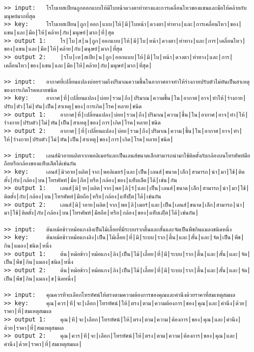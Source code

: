 \documentclass[11pt]{article}
\begin{document}
\begin{Verbatim}[commandchars=\\\{\}]
>> input:	โรโบเทสเปียนถูกออกแบบให้มีใบหน้าดวงตาท่าทางและการเคลื่อนไหวของแขนและมือให้คล้ายกับมนุษย์มากที่สุด
>> key:		โรโบเทสเปียน|ถูก|ออก|แบบ|ให้|มี|ใบหน้า|ดวงตา|ท่าทาง|และ|การเคลื่อนไหว|ของ|แขน|และ|มือ|ให้|คล้าย|กับ|มนุษย์|มาก|ที่|สุด
>> output 1:	โร|โบ|ส|น|ถูก|ออกแบบ|ให้|มี|ใบ|หน้า|ดวงตา|ท่าทาง|และ|การ|เคลื่อนไหว|ของ|แขน|และ|มือ|ให้|คล้าย|กับ|มนุษย์|มาก|ที่สุด
>> output 2:	|รโบ|เท|สเปีย|น|ถูก|ออกแบบ|ให้|มี|ใบ|หน้า|ดวงตา|ท่าทาง|และ|การ|เคลื่อนไหว|ของ|แขน|และ|มือ|ให้|คล้าย|กับ|มนุษย์|มาก|ที่สุด|

>> input:	อากาศที่เปลี่ยนแปลงบ่อยรวมถึงปริมาณความชื้นในอากาศอาจทำให้ร่างกายปรับตัวไม่ทันเป็นสาเหตุของการเกิดโรคหลายชนิด
>> key:		อากาศ|ที่|เปลี่ยนแปลง|บ่อย|รวม|ถึง|ปริมาณ|ความชื้น|ใน|อากาศ|อาจ|ทำให้|ร่างกาย|ปรับ|ตัว|ไม่|ทัน|เป็น|สาเหตุ|ของ|การเกิด|โรค|หลาย|ชนิด
>> output 1:	อากาศ|ที่|เปลี่ยนแปลง|บ่อย|รวม|ถึง|ปริมาณ|ความ|ชื้น|ใน|อากาศ|อาจ|ทำ|ให้|ร่างกาย|ปรับตัว|ไม่|ทัน|เป็น|สาเหตุ|ของ|การ|เกิด|โรค|หลาย|ชนิด
>> output 2:	อากาศ||ที่|เปลี่ยนแปลง|บ่อย|รวม|ถึง|ปริมาณ|ความ|ชื้น|ใน|อากาศ|อาจ|ทำ|ให้|ร่างกาย|ปรับตัว|ไม่|ทัน|เป็น|สาเหตุ|ของ|การ|เกิด|โรค|หลาย|ชนิด|

>> input:	เลนส์มิวอายผลิตจากพอลิเมอร์และเป็นเลนส์ขนาดเล็กสามารถนำมาใช้ติดตั้งกับกล้องบนโทรศัพท์มือถือหรือกล้องของแท็บเล็ตได้เช่นกัน
>> key:		เลนส์|มิวอาย|ผลิต|จาก|พอลิเมอร์|และ|เป็น|เลนส์|ขนาด|เล็ก|สามารถ|นำ|มา|ใช้|ติดตั้ง|กับ|กล้อง|บน|โทรศัพท์|มือ|ถือ|หรือ|กล้อง|ของ|แท็บเล็ต|ได้|เช่น|กัน
>> output 1:	เลนส์|มิ|าย|ผลิต|จาก|พอ|ลิ|ร์|และ|เป็น|เลนส์|ขนาด|เล็ก|สามารถ|นำ|มา|ใช้|ติดตั้ง|กับ|กล้อง|บน|โทรศัพท์|มือถือ|หรือ|กล้อง|แท็บ|็ต|ได้|เช่นกัน
>> output 2:	เลนส์|มิ|วอาย|ผลิต|จาก|พอ|ลิ|เมอร์|และ|เป็น|เลนส์|ขนาด|เล็ก|สามารถ|นำ|มา|ใช้|ติดตั้ง|กับ|กล้อง|บน|โทรศัพท์|มือถือ|หรือ|กล้อง|ของ|แท็บเล|็ต|ได้|เช่นกัน|

>> input:	ต้นหม้อข้าวหม้อแกงลิงเป็นไม้เลื้อยที่มีระบบรากตื้นและสั้นและจัดเป็นพืชกินแมลงชนิดหนึ่ง
>> key:		ต้นหม้อข้าวหม้อแกงลิง|เป็น|ไม้เลื้อย|ที่|มี|ระบบ|ราก|ตื้น|และ|สั้น|และ|จัด|เป็น|พืช|กิน|แมลง|ชนิด|หนึ่ง
>> output 1:	ต้น|หม้อข้าว|หม้อแกง|ลิง|เป็น|ไม้|เลื้อย|ที่|มี|ระบบ|ราก|ตื้น|และ|สั้น|และ|จัด|เป็น|พืช|กิน|แมลง|ชนิด|หนึ่ง
>> output 2:	ต้น|หม้อข้าว|หม้อแกง|ลิง|เป็น|ไม้|เลื้อย|ที่|มี|ระบบ|ราก|ตื้น|และ|สั้น|และ|จัด|เป็น|พืช|กิน|แมลง|ช|นิดหนึ่ง|

>> input:	คุณควรทีจะเลือกโทรทัศน์ให้ตรงตามความต้องการของคุณและคำนึงด้วยราคาที่สมเหตุสมผล
>> key:		คุณ|ควร|ที|จะ|เลือก|โทรทัศน์|ให้|ตรง|ตาม|ความต้องการ|ของ|คุณ|และ|คำนึง|ด้วย|ราคา|ที่|สมเหตุสมผล
>> output 1:	คุณ|ที|จะ|เลือก|โทรทัศน์|ให้|ตรง|ตาม|ความ|ต้องการ|ของ|คุณ|และ|คำนึง|ด้วย|ราคา|ที่|สมเหตุสมผล
>> output 2:	คุณ|ควร|ที|จะ|เลือก|โทรทัศน์|ให้|ตรง|ตาม|ความ|ต้องการ|ของ|คุณ|และ|คำนึง|ด้วย|ราคา|ที่|สมเหตุสมผล|


\end{Verbatim}
\end{document}
